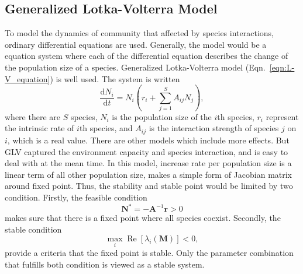 \subsection{Generalized Lotka-Volterra Model} To model the dynamics of community that affected by species interactions, ordinary differential equations are used. Generally, the model would be a equation system where each of the differential equation describes the change of the population size of a species. Generalized Lotka-Volterra model (Eqn.~\ref{eqn:L-V_equation}) is well used. The system is written \begin{equation}\label{eqn:L-V_equation} \frac{\mathrm{d} N_i}{\mathrm{d} t} = N_i \left( r_i + \sum_{j=1}^{S} A_{ij} N_j \right), \end{equation} where there are $S$ species, $N_i$ is the population size of the $i$th species, $r_i$ represent the intrinsic rate of $i$th species, and $A_{ij}$ is the interaction strength of species $j$ on $i$, which is a real value. There are other models which include more effects. But GLV captured the environment capacity and species interaction, and is easy to deal with at the mean time. In this model, increase rate per population size is a linear term of all other population size, makes a simple form of Jacobian matrix around fixed point. Thus, the stability and stable point would be limited by two condition. Firstly, the feasible condition \begin{equation} \boldsymbol{N}^* = -\boldsymbol{A}^{-1}\boldsymbol{r} > 0 \end{equation} makes sure that there is a fixed point where all species coexist. Secondly, the stable condition \begin{equation*} \max_i \operatorname{Re} \left[ \lambda_i(\boldsymbol{M}) \right] < 0, \end{equation*} provide a criteria that the fixed point is stable. Only the parameter combination that fulfills both condition is viewed as a stable system.

